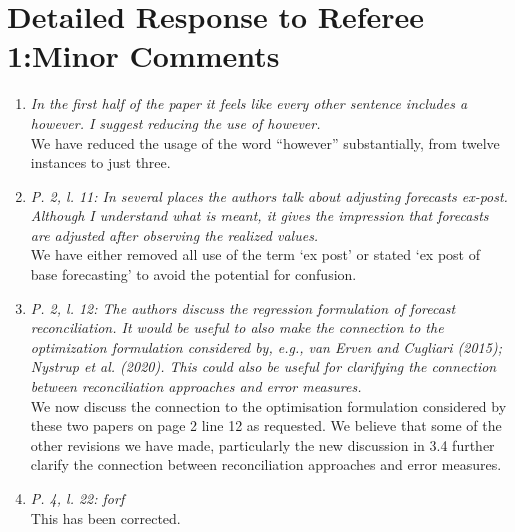 \documentclass[a4paper,11pt]{article}
\begin{document}
	    \section*{Detailed Response to Referee 1:Minor Comments}
	    
	    \begin{enumerate}
	    
	    \item \textit{In the first half of the paper it feels like every other sentence includes a however. I suggest reducing the use of however.}\\
	    
	    We have reduced the usage of the word ``however'' substantially, from twelve instances to just three.\\
	    
	    \item \textit{P. 2, l. 11: In several places the authors talk about adjusting forecasts ex-post. Although I understand what is meant, it gives the impression that forecasts are adjusted after observing the realized values.}\\
	    
	    We have either removed all use of the term `ex post' or stated `ex post of base forecasting' to avoid the potential for confusion.\\
	    
	    \item \textit{P. 2, l. 12: The authors discuss the regression formulation of forecast reconciliation. It would be useful to also make the connection to the optimization formulation considered by, e.g., van Erven and Cugliari (2015); Nystrup et al. (2020). This could also be useful for clarifying the connection between reconciliation approaches and error measures.}\\
	    
	    We now discuss the connection to the optimisation formulation considered by these two papers on page 2 line 12 as requested.  We believe that some of the other revisions we have made, particularly the new discussion in 3.4 further clarify the connection between reconciliation approaches and error measures.\\
	    
	    \item \textit{P. 4, l. 22: forf}\\
	    
	    This has been corrected.\\
	    

\end{enumerate}
\end{document}
